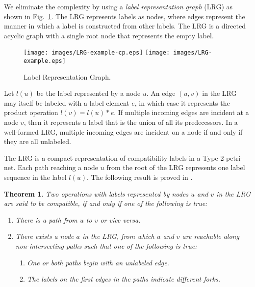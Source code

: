 \documentclass[conference]{IEEEtran}
\newtheorem{theorem}{Theorem}[section]
\begin{document}
We eliminate the complexity by using a {\em label representation
  graph} (LRG) as shown in Fig.~\ref{figure:LRG}. The LRG represents
labels as nodes, where edges represent the manner in which a label is
constructed from other labels. The LRG is a directed acyclic graph
with a single root node that represents the empty label.

\begin{figure}[!t]
  \centering
  \texttt{[image: images/LRG-example-cp.eps]}
  \hspace{0.125in}
  \texttt{[image: images/LRG-example.eps]}
  \caption{Label Representation Graph.}
  \label{figure:LRG}
\end{figure}

Let $l(u)$ be the label represented by a node $u$. An edge $(u,v)$ in
the LRG may itself be labeled with a label element $e$, in which case
it represents the product operation $l(v) = l(u) * e$. If multiple
incoming edges are incident at a node $v$, then it represents a label
that is the union of all its predecessors. In a well-formed LRG,
multiple incoming edges are incident on a node if and only if they are
all unlabeled.

The LRG is a compact representation of compatibility labels in a
Type-2 petri-net. Each path reaching a node $u$ from the root of the
LRG represents one label sequence in the label $l(u)$. The following
result is proved in \cite{ahir_thesis}.

\begin{theorem}

  Two operations with labels represented by nodes $u$ and $v$ in the
  LRG are said to be compatible, if and only if one of the following
  is true:

\begin{enumerate}
  \item There is a path from $u$ to $v$ or \emph{vice versa}.
  \item There exists a node $a$ in the LRG, from which $u$ and $v$ are
        reachable along non-intersecting paths such that one of the
        following is true:
    \begin{enumerate}
      \item One or both paths begin with an unlabeled edge.
      \item The labels on the first edges in the paths indicate
            different forks.
    \end{enumerate}
\end{enumerate}
\label{theorem:compatibility-LRG}
\end{theorem}
\end{document}
